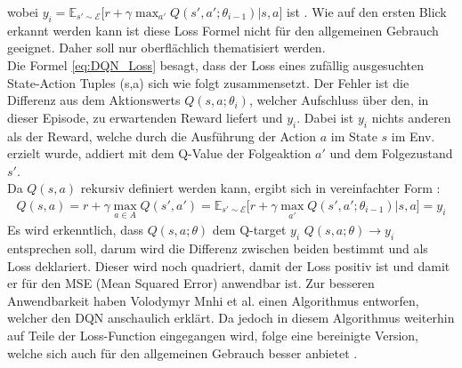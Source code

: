 wobei $y_i = \mathbb{E}_{s' \sim \mathcal{E}} \bigl\lbrack r+\gamma \max_{a'}Q(s',a';\theta_{i-1})|s,a \bigr\rbrack$ ist \cite{DQN}. 
Wie auf den ersten Blick erkannt werden kann ist diese Loss Formel nicht für den allgemeinen Gebrauch geeignet. Daher soll nur oberflächlich thematisiert werden.\\
Die Formel \ref{eq:DQN_Loss} besagt, dass der Loss eines zufällig ausgesuchten State-Action Tuples (s,a) sich wie folgt zusammensetzt. 
Der Fehler ist die Differenz aus dem Aktionswerts $Q(s,a; \theta_{i})$, welcher Aufschluss über den, in dieser Episode, zu erwartenden Reward liefert und $y_i$. Dabei ist $y_i$ nichts anderen als der Reward, welche durch die Ausführung der Action $a$ im State $s$ im Env. erzielt wurde, addiert mit dem Q-Value der Folgeaktion $a'$ und dem Folgezustand $s'$.\\
Da $Q(s,a)$ rekursiv definiert werden kann, ergibt sich in vereinfachter Form \cite[S.126]{DRL_Lapan}:
\begin{align}
	\label{eq:Q-Value_rekursive_def}
	Q(s,a) = r + \gamma \max_{a \in A}Q(s',a') = \mathbb{E}_{s' \sim \mathcal{E}} \bigl\lbrack r+\gamma \max_{a'}Q(s',a';\theta_{i-1})|s,a \bigr\rbrack = y_i
\end{align}
Es wird erkenntlich, dass $Q(s,a;\theta)$ dem Q-target $y_i$ $Q(s,a;\theta) \longrightarrow y_i$ entsprechen soll, darum wird die Differenz zwischen beiden bestimmt und als Loss deklariert. Dieser wird noch quadriert, damit der Loss positiv ist und damit er für den MSE (Mean Squared Error) anwendbar ist.
Zur besseren Anwendbarkeit haben Volodymyr Mnhi et al. einen Algorithmus entworfen, welcher den DQN anschaulich erklärt. Da jedoch in diesem Algorithmus weiterhin auf Teile der Loss-Function eingegangen wird, folge eine bereinigte Version, welche sich auch für den allgemeinen Gebrauch besser anbietet \cite[S. 149 f.]{DRL_Lapan}.
